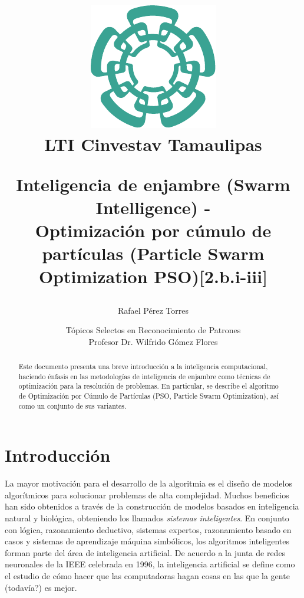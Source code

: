 \documentclass{article}
\begin{document}
\title{
	\begin{figure}[!ht]
	\centering
		\includegraphics[scale=0.8]{../resources/cinvestav-logo}
		\\[0.5cm]LTI Cinvestav Tamaulipas
	\end{figure}
	\vspace{1cm}
	Inteligencia de enjambre (Swarm Intelligence) -\\ Optimización por cúmulo de partículas (Particle Swarm Optimization PSO){\small[2.b.i-iii]}
	\vspace{1cm}
}
	
\author{Rafael Pérez Torres}	
		
\date{
	Tópicos Selectos en Reconocimiento de Patrones \\ 
	\vspace{0.8cm}
	Profesor Dr. Wilfrido Gómez Flores \\
	\vspace{1cm}
}

\maketitle

\begin{abstract}
Este documento presenta una breve introducción a la inteligencia computacional, haciendo énfasis en las metodologías de inteligencia de enjambre como técnicas de optimización para la resolución de problemas.
En particular, se describe el algoritmo de Optimización por Cúmulo de Partículas (PSO, Particle Swarm Optimization), así como un conjunto de sus variantes.
\end{abstract}

\section{Introducción}
La mayor motivación para el desarrollo de la algoritmia es el diseño de modelos algorítmicos para solucionar problemas de alta complejidad.
Muchos beneficios han sido obtenidos a través de la construcción de modelos basados en inteligencia natural y biológica, obteniendo los llamados \emph{sistemas inteligentes}.
En conjunto con lógica, razonamiento deductivo, sistemas expertos, razonamiento basado en casos y sistemas de aprendizaje máquina simbólicos, los algoritmos inteligentes forman parte del área de inteligencia artificial.
De acuerdo a la junta de redes neuronales de la IEEE celebrada en 1996, la inteligencia artificial se define como el estudio de cómo hacer que las computadoras hagan cosas en las que la gente (todavía?) es mejor.
\end{document}
